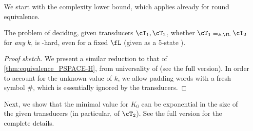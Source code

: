 We start with the complexity lower bound, which applies already for round equivalence.

\begin{theorem}
\label{thm:existential_equivalence_PSPACE-H}
The problem of deciding, given transducers $\cT_1,\cT_2$, whether $\cT_1\equiv_{k,\fL} \cT_2$ for \emph{any} $k$, is \PSPACE-hard, even for a fixed $\fL$ (given as a 5-state \DFA).
\end{theorem}
\begin{proof}[Proof sketch]
We present a similar reduction to that of \cref{thm:equivalence_PSPACE-H}, from universality of \NFAs (see the full version). In order to account for the unknown value of $k$, we allow padding words with a fresh symbol $\#$, which is essentially ignored by the transducers. 
\end{proof}

Next, we show that the minimal value for $K_0$ can be exponential in the size of the given transducers (in particular, of $\cT_2$). See the full version for the complete details.


